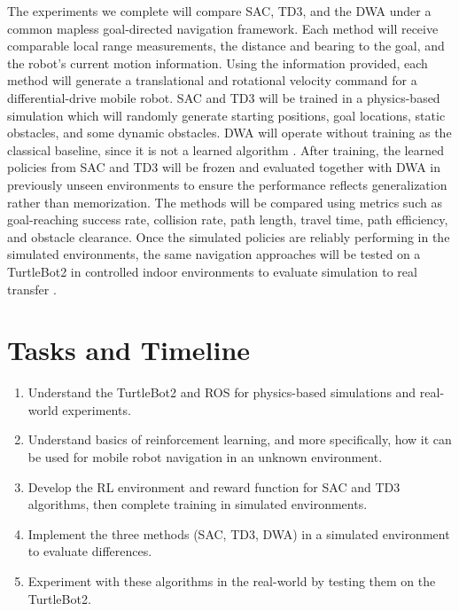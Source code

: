 \documentclass[conference]{IEEEtran}
\begin{document}
The experiments we complete will compare SAC, TD3, and the DWA under a common mapless goal-directed navigation framework.
Each method will receive comparable local range measurements, the distance and bearing to the goal, and the robot's current motion information.
Using the information provided, each method will generate a translational and rotational velocity command for a differential-drive mobile robot. 
SAC and TD3 will be trained in a physics-based simulation which will randomly generate starting positions, goal locations, static obstacles, and some dynamic obstacles. 
DWA will operate without training as the classical baseline, since it is not a learned algorithm \cite{Fox_Burgand}.
After training, the learned policies from SAC and TD3 will be frozen and evaluated together with DWA in previously unseen environments to ensure the performance reflects generalization rather than memorization.
The methods will be compared using metrics such as goal-reaching success rate, collision rate, path length, travel time, path efficiency, and obstacle clearance.
Once the simulated policies are reliably performing in the simulated environments, the same navigation approaches will be tested on a TurtleBot2 in controlled indoor environments to evaluate simulation to real transfer \cite{Tai_Lei} \cite{Yan_2D}.

\section{Tasks and Timeline}

\begin{enumerate}
    \item Understand the TurtleBot2 and ROS for physics-based simulations and real-world experiments.

    \item Understand basics of reinforcement learning, and more specifically, how it can be used for mobile robot navigation in an unknown environment.

    \item Develop the RL environment and reward function for SAC and TD3 algorithms, then complete training in simulated environments. 

    \item Implement the three methods (SAC, TD3, DWA) in a simulated environment to evaluate differences.

    \item Experiment with these algorithms in the real-world by testing them on the TurtleBot2.
\end{enumerate}
\end{document}
